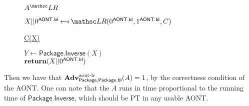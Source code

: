 \documentclass[11pt,twoside]{article}
\begin{document}
\begin{figure}[H]
{
\underline{$\advA^\LRO$}

\begin{algorithm}[H]
$X||0^\mathsf{AONT.bl} \getsr \LRO(0^\mathsf{AONT.bl},1^\mathsf{AONT.bl},C)$\\
\end{algorithm}

\underline{C(X)}

\begin{algorithm}[H]
$Y\gets\mathsf{Package.Inverse}(X)$\\
$\Return (X||0^\mathsf{AONT.bl})$\\
\end{algorithm}
}
\end{figure}

Then we have that $\textbf{Adv}^\text{aont-lr}_{\mathsf{Package},\mathsf{Package.bl}}(A)=1$, by the correctness condition of the AONT. One can note that the $A$ runs in time proportional to the running time of $\mathsf{Package.Inverse}$, which should be PT in any usable AONT. 
\end{document}
